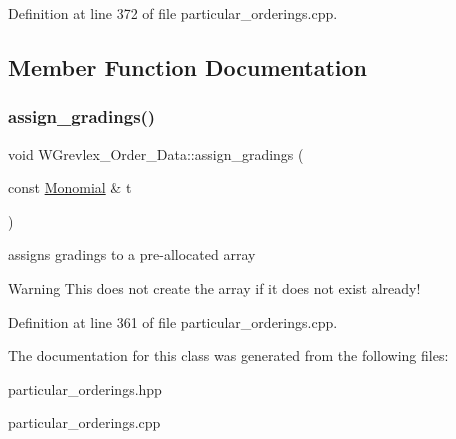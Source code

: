 Definition at line 372 of file particular\+\_\+orderings.\+cpp.



\subsection{Member Function Documentation}
\mbox{\label{class_w_grevlex___order___data_a43f37e1e5c272de1cd51afdde79727ae}} 
\subsubsection{\texorpdfstring{assign\+\_\+gradings()}{assign\_gradings()}}
{\footnotesize\ttfamily void W\+Grevlex\+\_\+\+Order\+\_\+\+Data\+::assign\+\_\+gradings (\begin{DoxyParamCaption}\item[{const \hyperlink{class_monomial}{Monomial} \&}]{t }\end{DoxyParamCaption})}



assigns gradings to a pre-\/allocated array 

\begin{DoxyWarning}{Warning}
This does not create the array if it does not exist already! 
\end{DoxyWarning}


Definition at line 361 of file particular\+\_\+orderings.\+cpp.



The documentation for this class was generated from the following files\+:\begin{DoxyCompactItemize}
\item 
particular\+\_\+orderings.\+hpp\item 
particular\+\_\+orderings.\+cpp\end{DoxyCompactItemize}
